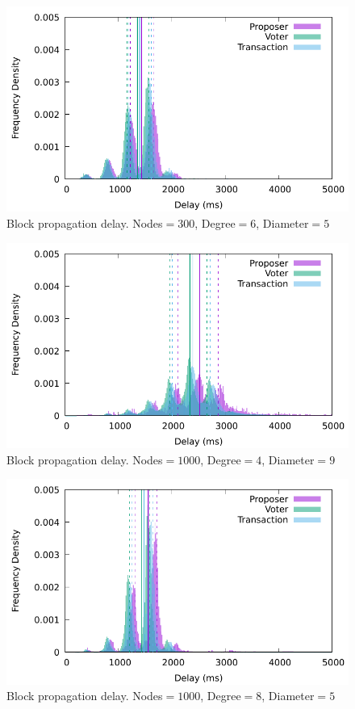  \begin{figure}[t]
   \centering
   \includegraphics[width=\linewidth]{figures/delay300nodes6.pdf}
   \caption{Block propagation delay. Nodes$=300$, Degree$=6$, Diameter$=5$}%
   \label{fig:propagation3}
 \end{figure}
 
 \begin{figure}[t]
   \centering
   \includegraphics[width=\linewidth]{figures/delay1000nodes4.pdf}
   \caption{Block propagation delay. Nodes$=1000$, Degree$=4$, Diameter$=9$}%
   \label{fig:propagation4}
 \end{figure}
 
 \begin{figure}[t]
   \centering
   \includegraphics[width=\linewidth]{figures/delay1000nodes8.pdf}
   \caption{Block propagation delay. Nodes$=1000$, Degree$=8$, Diameter$=5$}
   \label{fig:propagation5}
 \end{figure}
 


